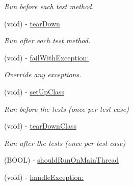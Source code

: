 \begin{DoxyCompactItemize}
\begin{DoxyCompactList}\small\item\em \-Run before each test method. \end{DoxyCompactList}\item 
\hypertarget{interface_g_h_test_case_ad800bebf23948e860bc4e3699708dd30}{
(void) -\/ \hyperlink{interface_g_h_test_case_ad800bebf23948e860bc4e3699708dd30}{tear\-Down}}
\label{interface_g_h_test_case_ad800bebf23948e860bc4e3699708dd30}

\begin{DoxyCompactList}\small\item\em \-Run after each test method. \end{DoxyCompactList}\item 
(void) -\/ \hyperlink{interface_g_h_test_case_aebee380283366e513402d9534e74d044}{fail\-With\-Exception\-:}
\begin{DoxyCompactList}\small\item\em \-Override any exceptions. \end{DoxyCompactList}\item 
\hypertarget{interface_g_h_test_case_ab441989e24b9942b73ed790281c1d967}{
(void) -\/ \hyperlink{interface_g_h_test_case_ab441989e24b9942b73ed790281c1d967}{set\-Up\-Class}}
\label{interface_g_h_test_case_ab441989e24b9942b73ed790281c1d967}

\begin{DoxyCompactList}\small\item\em \-Run before the tests (once per test case) \end{DoxyCompactList}\item 
\hypertarget{interface_g_h_test_case_aa34a28629d36d3ce176b12f4a106dbbd}{
(void) -\/ \hyperlink{interface_g_h_test_case_aa34a28629d36d3ce176b12f4a106dbbd}{tear\-Down\-Class}}
\label{interface_g_h_test_case_aa34a28629d36d3ce176b12f4a106dbbd}

\begin{DoxyCompactList}\small\item\em \-Run after the tests (once per test case) \end{DoxyCompactList}\item 
(\-B\-O\-O\-L) -\/ \hyperlink{interface_g_h_test_case_a08b9bcb2d874b7785918457257446066}{should\-Run\-On\-Main\-Thread}
\item 
\hypertarget{interface_g_h_test_case_a2d3628a89e080f97c76e2d4cb08acce0}{
(void) -\/ \hyperlink{interface_g_h_test_case_a2d3628a89e080f97c76e2d4cb08acce0}{handle\-Exception\-:}}
\label{interface_g_h_test_case_a2d3628a89e080f97c76e2d4cb08acce0}


\end{DoxyCompactItemize}
